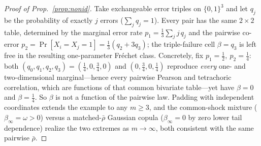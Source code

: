 \documentclass[11pt]{article}
\theoremstyle{plain}
\theoremstyle{definition}
\begin{document}
\begin{proof}[Proof of Prop.~\ref{prop:nonid}]
Take exchangeable error triples on $\{0,1\}^3$ and let $q_j$ be the probability of exactly $j$ errors ($\sum_j q_j=1$). Every
pair has the same $2{\times}2$ table, determined by the marginal error rate $p_1=\tfrac13\sum_j j\,q_j$ and the pairwise
co-error $p_2=\Pr[X_i{=}X_j{=}1]=\tfrac13(q_2+3q_3)$; the triple-failure cell $\beta=q_3$ is left free in the resulting
one-parameter Fr\'echet class. Concretely, fix $p_1=\tfrac12,\ p_2=\tfrac14$: both $(q_0,q_1,q_2,q_3)=(\tfrac14,0,\tfrac34,0)$
and $(0,\tfrac34,0,\tfrac14)$ reproduce \emph{every} one- and two-dimensional marginal---hence every pairwise Pearson and
tetrachoric correlation, which are functions of that common bivariate table---yet have $\beta=0$ and $\beta=\tfrac14$. So
$\beta$ is not a function of the pairwise law. Padding with independent coordinates extends the example to any $m\ge3$, and the
common-shock mixture ($\beta_\infty=\omega>0$) versus a matched-$\bar\rho$ Gaussian copula ($\beta_\infty=0$ by zero lower
tail dependence) realize the two extremes as $m\to\infty$, both consistent with the same pairwise $\bar\rho$.
\end{proof}
\end{document}
